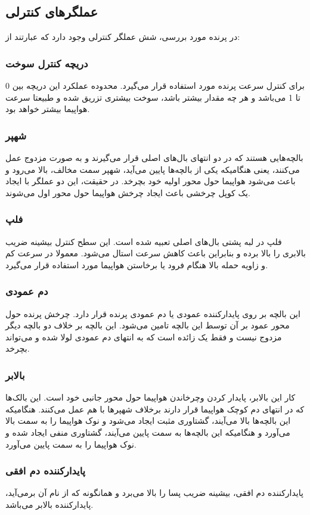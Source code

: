 \subsection{عملگرهای کنترلی}
در پرنده مورد بررسی، شش عملگر کنترلی وجود دارد که عبارتند از:
\subsubsection{دریچه کنترل سوخت}
برای کنترل سرعت پرنده مورد استفاده قرار می‌گیرد.
محدوده عملکرد این دریچه بین 0 تا 1 می‌باشد و هر چه مقدار بیشتر باشد، سوخت بیشتری تزریق شده و طبیعتا سرعت هواپیما بیشتر خواهد بود.
\subsubsection{شهپر}
بالچه‌هایی هستند که در دو انتهای بال‌های اصلی قرار می‌گیرند و به صورت مزدوج عمل می‌کنند، یعنی هنگامیکه یکی از بالچه‌ها پایین می‌آید، شهپر سمت مخالف، بالا می‌رود و باعث می‌شود هواپیما حول محور اولیه خود بچرخد.
 در حقیقت، این دو عملگر با ایجاد یک کوپل چرخشی باعث ایجاد چرخش هواپیما حول محور اول می‌شوند.
\subsubsection{فلپ}
فلپ در لبه پشتی بال‌های اصلی تعبیه شده است. 
این سطح کنترل بیشینه ضریب بالابری را بالا برده و بنابراین باعث کاهش سرعت استال می‌شود.
معمولا در سرعت کم و زاویه حمله بالا هنگام فرود یا برخاستن هواپیما مورد استفاده قرار می‌گیرد.
\subsubsection{دم عمودی}
این بالچه بر روی پایدارکننده عمودی یا دم عمودی پرنده قرار دارد.
چرخش پرنده حول محور عمود بر آن توسط این بالچه تامین می‌شود.
این بالچه بر خلاف دو بالچه دیگر مزدوج نیست و فقط یک زائده است که به انتهای دم عمودی لولا شده و می‌تواند بچرخد. 
\subsubsection{بالابر}
کار این بالابر، پایدار کردن وچرخاندن هواپیما حول محور جانبی خود است.
این بالک‌ها که در انتهای دم کوچک هواپیما قرار دارند برخلاف شهپرها با هم عمل می‌کنند.
هنگامیکه این بالچه‌ها بالا می‌آیند، گشتاوری مثبت ایجاد می‌شود و نوک هواپیما را به سمت بالا می‌آورد و هنگامیکه این بالچه‌ها به سمت پایین می‌آیند، گشتاوری منفی ایجاد شده و نوک هواپیما را به سمت پایین می‌آورد.
\subsubsection{پایدارکننده دم افقی}
پایدارکننده دم افقی، بیشینه ضریب پسا را بالا می‌برد و همانگونه که از نام آن بر‌می‌آید، پایدارکننده بالابر می‌باشد. 

